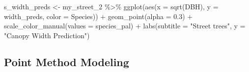 \documentclass[12pt,twoside]{reedthesis}
\newenvironment{Shaded}{\begin{snugshade}}{\end{snugshade}}
\newcommand{\AttributeTok}[1]{\textcolor[rgb]{0.77,0.63,0.00}{#1}}
\newcommand{\FloatTok}[1]{\textcolor[rgb]{0.00,0.00,0.81}{#1}}
\newcommand{\FunctionTok}[1]{\textcolor[rgb]{0.00,0.00,0.00}{#1}}
\newcommand{\NormalTok}[1]{#1}
\newcommand{\OtherTok}[1]{\textcolor[rgb]{0.56,0.35,0.01}{#1}}
\newcommand{\SpecialCharTok}[1]{\textcolor[rgb]{0.00,0.00,0.00}{#1}}
\newcommand{\StringTok}[1]{\textcolor[rgb]{0.31,0.60,0.02}{#1}}
\begin{document}
\begin{Shaded}
\begin{Highlighting}[]
\NormalTok{s\_width\_preds }\OtherTok{\textless{}{-}}\NormalTok{ my\_street\_2 }\SpecialCharTok{\%\textgreater{}\%}
    \FunctionTok{ggplot}\NormalTok{(}\FunctionTok{aes}\NormalTok{(}\AttributeTok{x =} \FunctionTok{sqrt}\NormalTok{(DBH), }\AttributeTok{y =}\NormalTok{ width\_preds, }\AttributeTok{color =}\NormalTok{ Species)) }\SpecialCharTok{+}
    \FunctionTok{geom\_point}\NormalTok{(}\AttributeTok{alpha =} \FloatTok{0.3}\NormalTok{) }\SpecialCharTok{+} \FunctionTok{scale\_color\_manual}\NormalTok{(}\AttributeTok{values =}\NormalTok{ species\_pal) }\SpecialCharTok{+}
    \FunctionTok{labs}\NormalTok{(}\AttributeTok{subtitle =} \StringTok{"Street trees"}\NormalTok{, }\AttributeTok{y =} \StringTok{"Canopy Width Prediction"}\NormalTok{)}
\end{Highlighting}
\end{Shaded}
\hypertarget{point-method-modeling}{%
\subsection*{Point Method Modeling}\label{point-method-modeling}}
\end{document}
